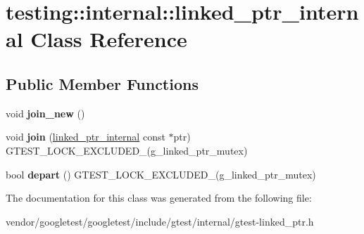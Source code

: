 \hypertarget{classtesting_1_1internal_1_1linked__ptr__internal}{}\section{testing\+:\+:internal\+:\+:linked\+\_\+ptr\+\_\+internal Class Reference}
\label{classtesting_1_1internal_1_1linked__ptr__internal}
\subsection*{Public Member Functions}
\begin{DoxyCompactItemize}
\item 
void {\bfseries join\+\_\+new} ()\hypertarget{classtesting_1_1internal_1_1linked__ptr__internal_a742af1f65df2d5e2b7198a1b74264a83}{}\label{classtesting_1_1internal_1_1linked__ptr__internal_a742af1f65df2d5e2b7198a1b74264a83}

\item 
void {\bfseries join} (\hyperlink{classtesting_1_1internal_1_1linked__ptr__internal}{linked\+\_\+ptr\+\_\+internal} const $\ast$ptr) G\+T\+E\+S\+T\+\_\+\+L\+O\+C\+K\+\_\+\+E\+X\+C\+L\+U\+D\+E\+D\+\_\+(g\+\_\+linked\+\_\+ptr\+\_\+mutex)\hypertarget{classtesting_1_1internal_1_1linked__ptr__internal_acd5a341459f7e81b10b4112d8c764e2a}{}\label{classtesting_1_1internal_1_1linked__ptr__internal_acd5a341459f7e81b10b4112d8c764e2a}

\item 
bool {\bfseries depart} () G\+T\+E\+S\+T\+\_\+\+L\+O\+C\+K\+\_\+\+E\+X\+C\+L\+U\+D\+E\+D\+\_\+(g\+\_\+linked\+\_\+ptr\+\_\+mutex)\hypertarget{classtesting_1_1internal_1_1linked__ptr__internal_a8699e539d9702d363ef0351012d1b3ca}{}\label{classtesting_1_1internal_1_1linked__ptr__internal_a8699e539d9702d363ef0351012d1b3ca}

\end{DoxyCompactItemize}


The documentation for this class was generated from the following file\+:\begin{DoxyCompactItemize}
\item 
vendor/googletest/googletest/include/gtest/internal/gtest-\/linked\+\_\+ptr.\+h\end{DoxyCompactItemize}

